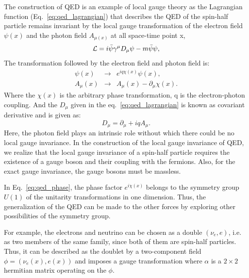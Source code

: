 The construction of QED is an example of local gauge theory as the Lagrangian function (Eq.~\ref{eq:qed_lagrangian}) that describes the QED of the spin-half particle remains invariant by the local gauge transformation of the electron field $\psi(x)$ and the photon field $A_{\mu(x)}$ at all space-time point x,
\begin{equation}\label{eq:qed_lagrangian}
    \mathcal{L} = i \bar{\psi}\gamma^{\mu} D_{\mu}\psi - m\bar{\psi}\psi,
\end{equation}
The transformation followed by the electron field and photon field is:
\begin{eqnarray}\label{eq:qed_phase}
    \psi(x) & \rightarrow & e^{iq\chi(x)}\psi(x), \nonumber \\
    A_\mu(x) & \rightarrow & A_\mu(x) - {\partial_\mu \chi(x)}. 
\end{eqnarray}
Where the $\chi(x)$ is the arbitrary phase transformation, q is the electron-photon coupling.
And the $D_{\mu}$ given in the eq.~\ref{eq:qed_lagrangian} is known as covariant derivative and is given as:
\begin{equation}
    D_{\mu} = \partial_{\mu} + iqA_{\mu}.
\end{equation}
Here, the photon field plays an intrinsic role without which there could be no local gauge invariance. In the construction of the local gauge invariance of QED, we realize that the local gauge invariance of a spin-half particle requires the existence of a gauge boson and their coupling with the fermions. Also, for the exact gauge invariance, the gauge bosons must be massless. 

In Eq.~\ref{eq:qed_phase}, the phase factor $e^{i\chi(x)}$ belongs to the symmetry group $U(1)$ of the unitarity transformations in one dimension. Thus, the generalization of the QED can be made to the other forces by exploring other possibilities of the symmetry group.

For example, the electrons and neutrino can be chosen as a double $(\nu_e,e)$, i.e. as two members of the same family, since both of them are spin-half particles.
Thus, it can be described as the doublet by a two-component field $\phi = (\nu_e(x),e(x))$ and imposes a gauge transformation where $\alpha$ is a $2\times 2$ hermitian matrix operating on the $\phi$.

